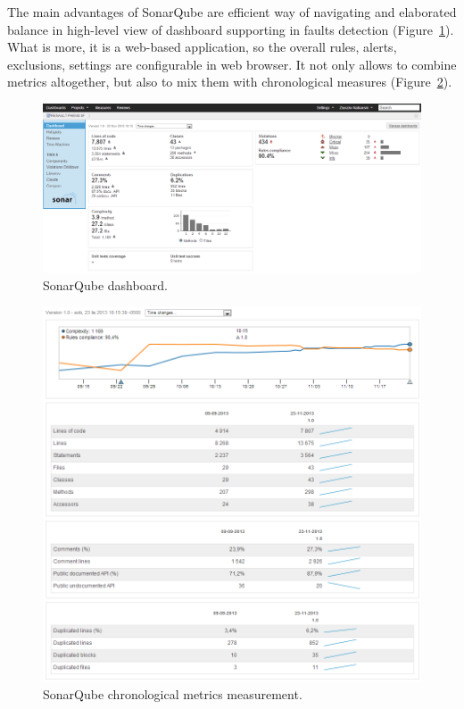 The main advantages of SonarQube are efficient way of navigating and elaborated balance in high-level view of dashboard supporting in faults detection (Figure~\ref{fig:sonar1}). What is more, it is a web-based application, so the overall rules, alerts, exclusions, settings are configurable in web browser. It not only allows to combine metrics altogether, but also to mix them with chronological measures (Figure~\ref{fig:sonar2}).

\begin{figure}[h!]
	\centering
	\includegraphics[scale=0.45]{img/sonar2.png} 
	\caption{SonarQube dashboard.}		
	\label{fig:sonar1}
\end{figure}


\begin{figure}[h!]
	\centering
	\includegraphics[scale=0.45]{img/sonar4.png} 
	\caption{SonarQube chronological metrics measurement.}		
	\label{fig:sonar2}
\end{figure}



